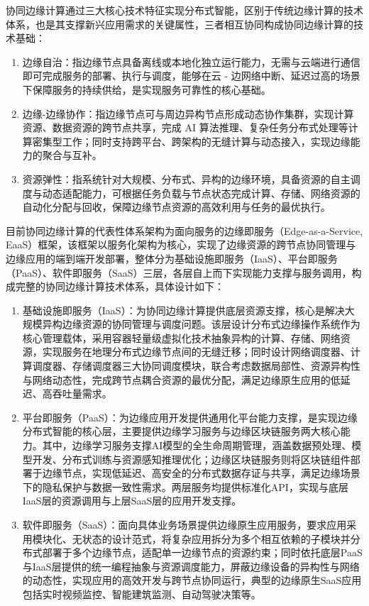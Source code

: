 协同边缘计算通过三大核心技术特征实现分布式智能，区别于传统边缘计算的技术体系，也是其支撑新兴应用需求的关键属性，三者相互协同构成协同边缘计算的技术基础：
\begin{enumerate}[topsep = 0 pt, itemsep= 0 pt, parsep=0pt, partopsep=0pt, leftmargin=0pt, itemindent=48pt, labelsep=0pt, listparindent=24pt, label=（\arabic*）]
	\item 边缘自治：指边缘节点具备离线或本地化独立运行能力，无需与云端进行通信即可完成服务的部署、执行与调度，能够在云 - 边网络中断、延迟过高的场景下保障服务的持续供给，是实现服务可靠性的核心基础\cite{6710075}。
	\item 边缘-边缘协作：指边缘节点可与周边异构节点形成动态协作集群，实现计算资源、数据资源的跨节点共享，完成 AI 算法推理、复杂任务分布式处理等计算密集型工作；同时支持跨平台、跨架构的无缝计算与动态接入，实现边缘能力的聚合与互补\cite{varghese2017edgeasaservicedistributedcloudarchitectures}。
	\item 资源弹性：指系统针对大规模、分布式、异构的边缘环境，具备资源的自主调度与动态适配能力，可根据任务负载与节点状态完成计算、存储、网络资源的自动化分配与回收，保障边缘节点资源的高效利用与任务的最优执行\cite{9223724}。
\end{enumerate}

目前协同边缘计算的代表性体系架构为面向服务的边缘即服务（Edge-as-a-Service, EaaS）框架，该框架以服务化架构为核心，实现了边缘资源的跨节点协同管理与边缘应用的端到端开发部署，整体分为基础设施即服务（IaaS）、平台即服务（PaaS）、软件即服务（SaaS）三层，各层自上而下实现能力支撑与服务调用，构成完整的协同边缘计算技术体系，具体设计如下：
\begin{enumerate}[topsep = 0 pt, itemsep= 0 pt, parsep=0pt, partopsep=0pt, leftmargin=0pt, itemindent=48pt, labelsep=0pt, listparindent=24pt, label=（\arabic*）]
    \item 基础设施即服务（IaaS）\cite{9724454}：为协同边缘计算提供底层资源支撑，核心是解决大规模异构边缘资源的协同管理与调度问题。该层设计分布式边缘操作系统作为核心管理载体，采用容器轻量级虚拟化技术抽象异构的计算、存储、网络资源，实现服务在地理分布式边缘节点间的无缝迁移；同时设计网络调度器、计算调度器、存储调度器三大协同调度模块，联合考虑数据局部性、资源异构性与网络动态性，完成跨节点耦合资源的最优分配，满足边缘原生应用的低延迟、高吞吐量需求。
    \item 平台即服务（PaaS）\cite{9141564}：为边缘应用开发提供通用化平台能力支撑，是实现边缘分布式智能的核心层，主要提供边缘学习服务与边缘区块链服务两大核心能力。其中，边缘学习服务支撑AI模型的全生命周期管理，涵盖数据预处理、模型开发、分布式训练与资源感知推理优化；边缘区块链服务则将区块链组件部署于边缘节点，实现低延迟、高安全的分布式数据存证与共享，满足边缘场景下的隐私保护与数据一致性需求。两层服务均提供标准化API，实现与底层IaaS层的资源调用与上层SaaS层的应用开发支撑。
    \item 软件即服务（SaaS）\cite{8669948}：面向具体业务场景提供边缘原生应用服务，要求应用采用模块化、无状态的设计范式，将复杂应用拆分为多个相互依赖的子模块并分布式部署于多个边缘节点，适配单一边缘节点的资源约束；同时依托底层PaaS与IaaS层提供的统一编程抽象与资源调度能力，屏蔽边缘设备的异构性与网络的动态性，实现应用的高效开发与跨节点协同运行，典型的边缘原生SaaS应用包括实时视频监控、智能建筑监测、自动驾驶决策等。
\end{enumerate}

